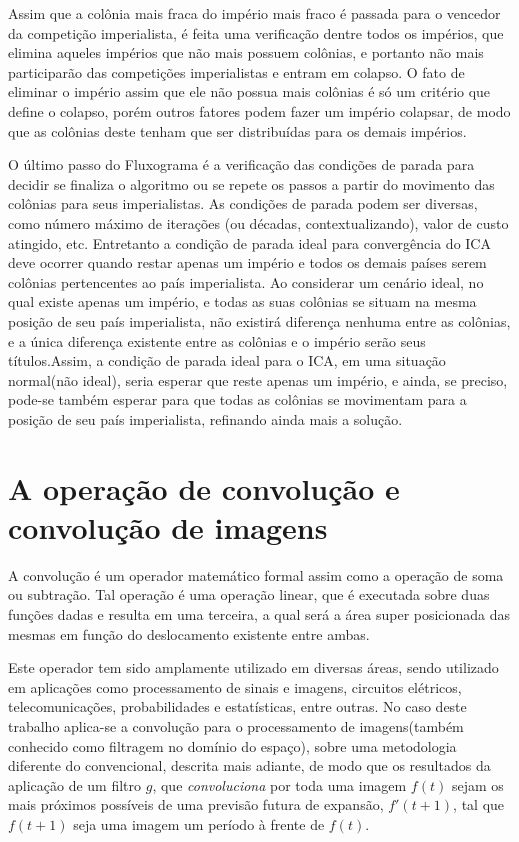 Assim que a colônia mais fraca do império mais fraco é passada para o vencedor da competição imperialista, é feita uma verificação dentre todos os impérios, que elimina aqueles impérios que não mais possuem colônias, e portanto não mais participarão das competições imperialistas e entram em colapso. O fato de eliminar o império assim que ele não possua mais colônias é só um critério que define o colapso, porém outros fatores podem fazer um império colapsar, de modo que as colônias deste tenham que ser distribuídas para os demais impérios.

O último passo do Fluxograma é a verificação das condições de parada para decidir se finaliza o algoritmo ou se repete os passos a partir do movimento das colônias para seus imperialistas. As condições de parada podem ser diversas, como número máximo de iterações (ou décadas, contextualizando), valor de custo atingido, etc.  Entretanto a condição de parada ideal para convergência do ICA deve ocorrer quando restar apenas um império e todos os demais países serem colônias pertencentes ao país imperialista. Ao considerar um cenário ideal, no qual existe apenas um império, e todas as suas colônias se situam na mesma posição de seu país imperialista, não existirá diferença nenhuma entre as colônias, e a única diferença existente entre as colônias e o império serão seus títulos.Assim, a condição de parada ideal para o ICA, em uma situação normal(não ideal), seria esperar que reste apenas um império, e ainda, se preciso, pode-se também esperar para que todas as colônias se movimentam para a posição de seu país imperialista, refinando ainda mais a solução.










\section{A operação de convolução e convolução de imagens}
   
A convolução é um operador matemático formal assim como a operação de soma ou subtração. Tal operação é uma operação linear, que é executada sobre duas funções dadas e resulta em uma terceira, a qual será a área super posicionada das mesmas em função do deslocamento existente entre ambas.

Este operador tem sido amplamente utilizado em diversas áreas, sendo utilizado em aplicações como processamento de sinais e imagens, circuitos elétricos, telecomunicações, probabilidades e estatísticas, entre outras. No caso deste trabalho aplica-se a convolução para o processamento de imagens(também conhecido como filtragem no domínio do espaço), sobre uma metodologia diferente do convencional, descrita mais adiante, de modo que os resultados da aplicação de um filtro \(g\), que \emph{convoluciona} por toda uma imagem \(f(t)\) sejam os mais próximos possíveis de uma previsão futura de expansão, \(f'(t+1)\), tal que \(f(t+1)\) seja uma imagem um período à frente de \(f(t)\).

